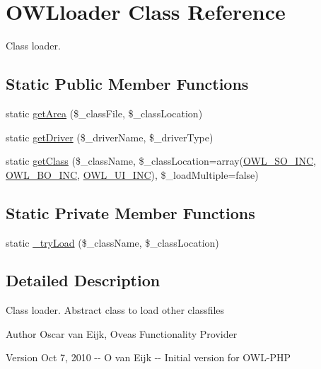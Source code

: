 \section{OWLloader Class Reference}
\label{classOWLloader}


Class loader.  


\subsection*{Static Public Member Functions}
\begin{DoxyCompactItemize}
\item 
static \hyperlink{classOWLloader_a7a405369cad4d0a09f82cad218bc4824}{getArea} (\$\_\-classFile, \$\_\-classLocation)
\item 
static \hyperlink{classOWLloader_a5911bb36f76142aadfaa6d554113800c}{getDriver} (\$\_\-driverName, \$\_\-driverType)
\item 
static \hyperlink{classOWLloader_a271d6508b029b3989db57f4d9b9b7677}{getClass} (\$\_\-className, \$\_\-classLocation=array(\hyperlink{OWLloader_8php_a75dffdef5ba58a0ba5f21ed40627897f}{OWL\_\-SO\_\-INC}, \hyperlink{OWLloader_8php_aca50646bc73c3addf0e0f25081eae0ae}{OWL\_\-BO\_\-INC}, \hyperlink{OWLloader_8php_a2e11101c70f011a91d0d9c7f8e217738}{OWL\_\-UI\_\-INC}), \$\_\-loadMultiple=false)
\end{DoxyCompactItemize}
\subsection*{Static Private Member Functions}
\begin{DoxyCompactItemize}
\item 
static \hyperlink{classOWLloader_a763911b4bc08982e24f1f897362f8c90}{\_\-tryLoad} (\$\_\-className, \$\_\-classLocation)
\end{DoxyCompactItemize}


\subsection{Detailed Description}
Class loader. Abstract class to load other classfiles \begin{DoxyAuthor}{Author}
Oscar van Eijk, Oveas Functionality Provider 
\end{DoxyAuthor}
\begin{DoxyVersion}{Version}
Oct 7, 2010 -\/-\/ O van Eijk -\/-\/ Initial version for OWL-\/PHP 
\end{DoxyVersion}


